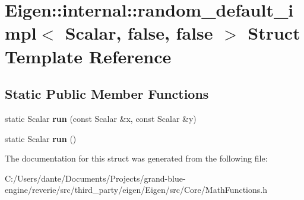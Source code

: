 \hypertarget{struct_eigen_1_1internal_1_1random__default__impl_3_01_scalar_00_01false_00_01false_01_4}{}\section{Eigen\+::internal\+::random\+\_\+default\+\_\+impl$<$ Scalar, false, false $>$ Struct Template Reference}
\label{struct_eigen_1_1internal_1_1random__default__impl_3_01_scalar_00_01false_00_01false_01_4}
\subsection*{Static Public Member Functions}
\begin{DoxyCompactItemize}
\item 
\mbox{\label{struct_eigen_1_1internal_1_1random__default__impl_3_01_scalar_00_01false_00_01false_01_4_a98e27074cf7759579e43fd980e40fc6f}} 
static Scalar {\bfseries run} (const Scalar \&x, const Scalar \&y)
\item 
\mbox{\label{struct_eigen_1_1internal_1_1random__default__impl_3_01_scalar_00_01false_00_01false_01_4_ad983cf6fd0954a107662369eb07b8d24}} 
static Scalar {\bfseries run} ()
\end{DoxyCompactItemize}


The documentation for this struct was generated from the following file\+:\begin{DoxyCompactItemize}
\item 
C\+:/\+Users/dante/\+Documents/\+Projects/grand-\/blue-\/engine/reverie/src/third\+\_\+party/eigen/\+Eigen/src/\+Core/Math\+Functions.\+h\end{DoxyCompactItemize}
